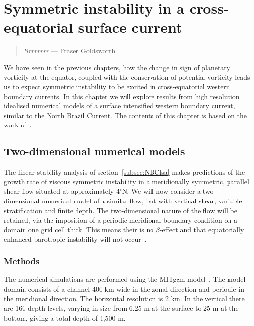 \chapter{Symmetric instability in a cross-equatorial surface current}
\begin{quote}
    \textit{Brrrrrrr} --- Fraser Goldsworth
\end{quote}

We have seen in the previous chapters, how the change in sign of planetary vorticity at the equator, coupled with the conservation of potential vorticity leads us to expect symmetric instability to be excited in cross-equatorial western boundary currents. In this chapter we will explore results from high resolution idealised numerical models of a surface intensified western boundary current, similar to the North Brazil Current. The contents of this chapter is based on the work of~\citet{Goldsworth2021a}.

\section{Two-dimensional numerical models}
The linear stability analysis of section~\ref{subsec:NBClsa} makes predictions of the growth rate of viscous symmetric instability in a meridionally symmetric, parallel shear flow situated at approximately 4$^\circ$N. We will now consider a two dimensional numerical model of a similar flow, but with vertical shear, variable stratification and finite depth. The two-dimensional nature of the flow will be retained, via the imposition of a periodic meridional boundary condition on a domain one grid cell thick. This means their is no $\beta$-effect and that equatorially enhanced barotropic instability will not occur~\citep{Edwards1998I,Edwards1998II}.

\subsection{Methods}
\label{subsec:2DMethods}
The numerical simulations are performed using the MITgcm model~\citep{Marshall1997}. The model domain consists of a channel 400 km wide in the zonal direction and periodic in the meridional direction. The horizontal resolution is 2 km. In the vertical there are 160 depth levels, varying in size from 6.25 m at the surface to 25 m at the bottom, giving a total depth of 1,500 m.


